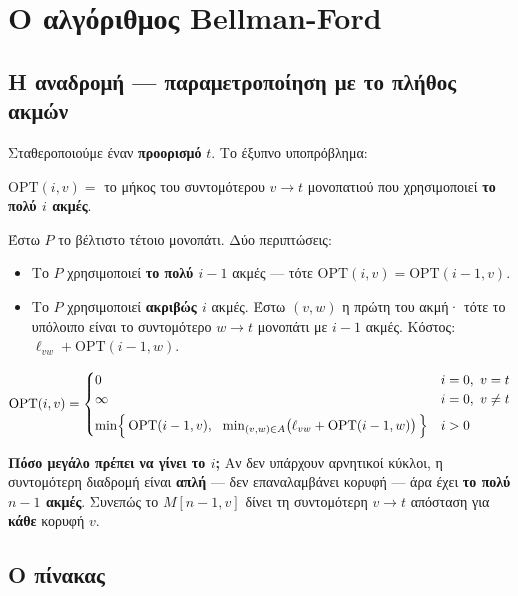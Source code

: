 \documentclass[11pt,a4paper]{article}
\begin{document}
\section{Ο αλγόριθμος Bellman-Ford}

\subsection{Η αναδρομή --- παραμετροποίηση με το πλήθος ακμών}

Σταθεροποιούμε έναν \textbf{προορισμό} $t$. Το έξυπνο υποπρόβλημα:

\begin{keypoint}
$\text{OPT}(i, v) = $ το μήκος του συντομότερου $v \to t$ μονοπατιού που
χρησιμοποιεί \textbf{το πολύ $i$ ακμές}.
\end{keypoint}

Έστω $P$ το βέλτιστο τέτοιο μονοπάτι. Δύο περιπτώσεις:
\begin{itemize}
  \item Το $P$ χρησιμοποιεί \textbf{το πολύ $i-1$} ακμές --- τότε
  $\text{OPT}(i, v) = \text{OPT}(i-1, v)$.
  \item Το $P$ χρησιμοποιεί \textbf{ακριβώς $i$} ακμές. Έστω $(v, w)$ η πρώτη
  του ακμή· τότε το υπόλοιπο είναι το συντομότερο $w \to t$ μονοπάτι με $i-1$
  ακμές. Κόστος: $\ell_{vw} + \text{OPT}(i-1, w)$.
\end{itemize}

\begin{keypoint}
\[
\text{OPT}(i, v) =
\begin{cases}
0 & i = 0,\ v = t \\
\infty & i = 0,\ v \ne t \\[4pt]
\min\Bigl\{\, \text{OPT}(i-1, v),\ \ \min_{(v,w) \in A}\bigl(\ell_{vw} +
\text{OPT}(i-1, w)\bigr) \,\Bigr\} & i > 0
\end{cases}
\]
\end{keypoint}

\begin{intuition}
\textbf{Πόσο μεγάλο πρέπει να γίνει το $i$;} Αν δεν υπάρχουν αρνητικοί κύκλοι, η
συντομότερη διαδρομή είναι \textbf{απλή} --- δεν επαναλαμβάνει κορυφή --- άρα έχει
\textbf{το πολύ $n-1$ ακμές}. Συνεπώς το $M[n-1, v]$ δίνει τη συντομότερη
$v \to t$ απόσταση για \textbf{κάθε} κορυφή $v$.
\end{intuition}

\subsection{Ο πίνακας}
\end{document}
